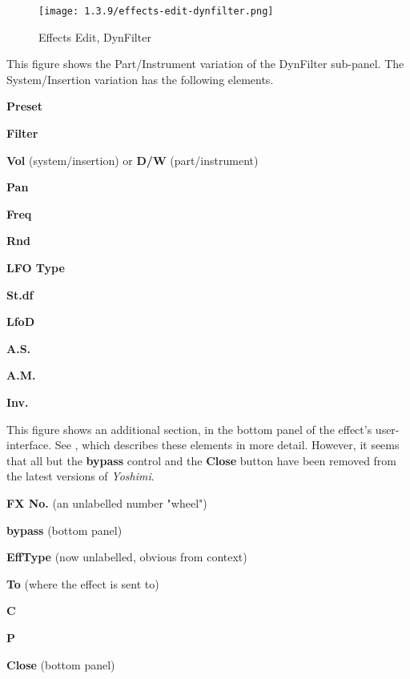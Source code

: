 \begin{figure}[H]
   \centering
   \texttt{[image: 1.3.9/effects-edit-dynfilter.png]}
   \caption{Effects Edit, DynFilter}
   \label{fig:effects_edit_dynfilter}
\end{figure}

   This figure shows the Part/Instrument variation of the DynFilter sub-panel.
   The System/Insertion variation has the following elements.

   \begin{enumber}
      \item \textbf{Preset}
      \item \textbf{Filter}
      \item \textbf{Vol} (system/insertion) or \textbf{D/W} (part/instrument)
      \item \textbf{Pan}
      \item \textbf{Freq}
      \item \textbf{Rnd}
      \item \textbf{LFO Type}
      \item \textbf{St.df}
      \item \textbf{LfoD}
      \item \textbf{A.S.}
      \item \textbf{A.M.}
      \item \textbf{Inv.}
   \end{enumber}

   This figure shows an additional section, in the bottom panel of the effect's
   user-interface.
   See , which
   describes these elements in more detail.
   However, it seems that all but the \textbf{bypass} control and
   the \textbf{Close} button have been removed
   from the latest versions of \textsl{Yoshimi}.

   \begin{enumber}
      \item \textbf{FX No.} (an unlabelled number "wheel")
      \item \textbf{bypass} (bottom panel)
      \item \textbf{EffType} (now unlabelled, obvious from context)
      \item \textbf{To} (where the effect is sent to)
      \item \textbf{C}
      \item \textbf{P}
      \item \textbf{Close} (bottom panel)
   \end{enumber}

